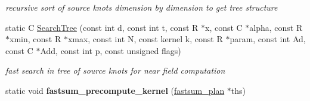 \begin{DoxyCompactItemize}
\begin{DoxyCompactList}\small\item\em recursive sort of source knots dimension by dimension to get tree structure \end{DoxyCompactList}\item 
\hypertarget{group__applications__fastsum_ga9768ac98ad590c31decb9995814eb2d4}{static C \hyperlink{group__applications__fastsum_ga9768ac98ad590c31decb9995814eb2d4}{Search\-Tree} (const int d, const int t, const R $\ast$x, const C $\ast$alpha, const R $\ast$xmin, const R $\ast$xmax, const int N, const kernel k, const R $\ast$param, const int Ad, const C $\ast$Add, const int p, const unsigned flags)}\label{group__applications__fastsum_ga9768ac98ad590c31decb9995814eb2d4}

\begin{DoxyCompactList}\small\item\em fast search in tree of source knots for near field computation \end{DoxyCompactList}\item 
\hypertarget{group__applications__fastsum_gad686ea477bdbb429be87842a777f1962}{static void {\bfseries fastsum\-\_\-precompute\-\_\-kernel} (\hyperlink{group__applications__fastsum_gad953252f6b309404991c4afc7b98b34b}{fastsum\-\_\-plan} $\ast$ths)}\label{group__applications__fastsum_gad686ea477bdbb429be87842a777f1962}


\end{DoxyCompactItemize}
